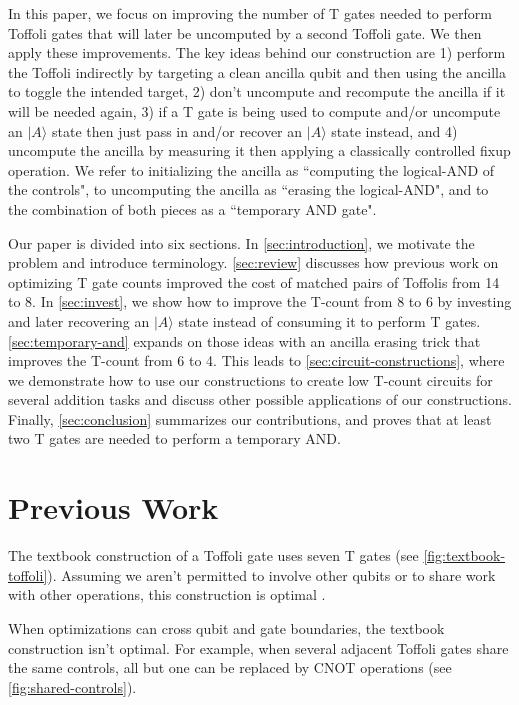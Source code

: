 \documentclass[twocolumn,longbibliography]{quantumarticle-customized}
\begin{document}
In this paper, we focus on improving the number of T gates needed to perform Toffoli gates that will later be uncomputed by a second Toffoli gate.
We then apply these improvements.
The key ideas behind our construction are 1) perform the Toffoli indirectly by targeting a clean ancilla qubit and then using the ancilla to toggle the intended target, 2) don't uncompute and recompute the ancilla if it will be needed again, 3) if a T gate is being used to compute and/or uncompute an $|A\rangle$ state then just pass in and/or recover an $|A\rangle$ state instead, and 4) uncompute the ancilla by measuring it then applying a classically controlled fixup operation.
We refer to initializing the ancilla as ``computing the logical-AND of the controls", to uncomputing the ancilla as ``erasing the logical-AND", and to the combination of both pieces as a ``temporary AND gate".

Our paper is divided into six sections.
In \autoref{sec:introduction}, we motivate the problem and introduce terminology.
\autoref{sec:review} discusses how previous work on optimizing T gate counts improved the cost of matched pairs of Toffolis from 14 to 8.
In \autoref{sec:invest}, we show how to improve the T-count from 8 to 6 by investing and later recovering an $|A\rangle$ state instead of consuming it to perform T gates.
\autoref{sec:temporary-and} expands on those ideas with an ancilla erasing trick that improves the T-count from 6 to 4.
This leads to \autoref{sec:circuit-constructions}, where we demonstrate how to use our constructions to create low T-count circuits for several addition tasks and discuss other possible applications of our constructions.
Finally, \autoref{sec:conclusion} summarizes our contributions, and proves that at least two T gates are needed to perform a temporary AND.


\section{Previous Work}
\label{sec:review}

The textbook construction of a Toffoli gate uses seven T gates \cite{Nielsen2009} (see \autoref{fig:textbook-toffoli}).
Assuming we aren't permitted to involve other qubits or to share work with other operations, this construction is optimal \cite{Gosset2014}.

When optimizations can cross qubit and gate boundaries, the textbook construction isn't optimal.
For example, when several adjacent Toffoli gates share the same controls, all but one can be replaced by CNOT operations (see \autoref{fig:shared-controls}).
\end{document}

